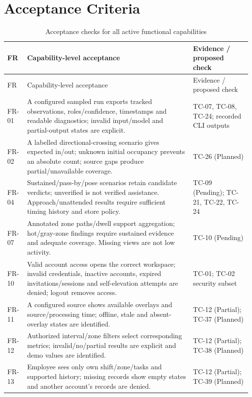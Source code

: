 \section{Acceptance Criteria}
\begin{longtable}{P{0.10\textwidth}P{0.53\textwidth}P{0.27\textwidth}}
\caption{Acceptance checks for all active functional capabilities}\label{tab:fr-acceptance}\\
\toprule
FR & Capability-level acceptance & Evidence / proposed check\\
\midrule
\endfirsthead
\toprule
FR & Capability-level acceptance & Evidence / proposed check\\
\midrule
\endhead
FR-01 & A configured sampled run exports tracked observations, roles/confidence, timestamps and readable diagnostics; invalid input/model and partial-output states are explicit. & TC-07, TC-08, TC-24; recorded CLI outputs\\
FR-02 & A labelled directional-crossing scenario gives expected in/out; unknown initial occupancy prevents an absolute count; source gaps produce partial/unavailable coverage. & TC-26 (Planned)\\
FR-04 & Sustained/pass-by/pose scenarios retain candidate verdicts; unverified is not verified assistance. Approach/unattended results require sufficient timing history and store policy. & TC-09 (Pending); TC-21, TC-22, TC-24\\
FR-07 & Annotated zone paths/dwell support aggregation; hot/gray-zone findings require sustained evidence and adequate coverage. Missing views are not low activity. & TC-10 (Pending)\\
FR-10 & Valid account access opens the correct workspace; invalid credentials, inactive accounts, expired invitations/sessions and self-elevation attempts are denied; logout removes access. & TC-01; TC-02 security subset\\
FR-11 & A configured source shows available overlays and source/processing time; offline, stale and absent-overlay states are identified. & TC-12 (Partial); TC-37 (Planned)\\
FR-12 & Authorized interval/zone filters select corresponding metrics; invalid/no/partial results are explicit and demo values are identified. & TC-12 (Partial); TC-38 (Planned)\\
FR-13 & Employee sees only own shift/zone/tasks and supported history; missing records show empty states and another account's records are denied. & TC-12 (Partial); TC-39 (Planned)\\

\end{longtable}
